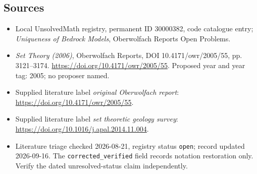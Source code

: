\documentclass[11pt]{article}
\begin{document}
\subsection{Sources}
\begin{itemize}\item Local UnsolvedMath registry, permanent ID 30000382, code catalogue entry; \emph{Uniqueness of Bedrock Models}, Oberwolfach Reports Open Problems.\item \emph{Set Theory (2006)}, Oberwolfach Reports, DOI 10.4171/owr/2005/55, pp. 3121--3174. \url{https://doi.org/10.4171/owr/2005/55}. Proposed year and year tag: 2005; no proposer named.\item Supplied literature label \emph{original Oberwolfach report}: \url{https://doi.org/10.4171/owr/2005/55}.\item Supplied literature label \emph{set theoretic geology survey}: \url{https://doi.org/10.1016/j.apal.2014.11.004}.\item Literature triage checked 2026-08-21, registry status \texttt{open}; record updated 2026-09-16. The \texttt{corrected\_verified} field records notation restoration only. Verify the dated unresolved-status claim independently.\end{itemize}
\end{document}
